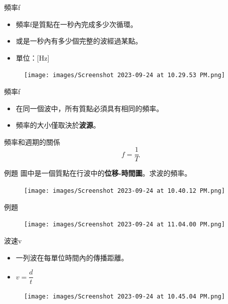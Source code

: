 \documentclass[13pt]{beamer}
\begin{document}
\begin{frame}{頻率f}
    \begin{itemize}
        \item 頻率f是質點在一秒內完成多少次循環。
        \item 或是一秒內有多少個完整的波經過某點。
        \item 單位：[Hz]
    \end{itemize}

    \begin{figure}
        \centering
        \texttt{[image: images/Screenshot 2023-09-24 at 10.29.53 PM.png]}


    \end{figure}
\end{frame}

\begin{frame}{頻率f}
    \begin{itemize}
        \item 在同一個波中，所有質點必須具有相同的頻率。
        \item 頻率的大小僅取決於\textbf{波源}。
    \end{itemize}\bigskip
    \begin{alertblock}{頻率和週期的關係}
        \[f=\frac{1}{T}\]
    \end{alertblock}
\end{frame}

\begin{frame}[t]{例題}
    圖中是一個質點在行波中的\textbf{位移-時間圖}。求波的頻率。
    \begin{figure}
        \centering
        \texttt{[image: images/Screenshot 2023-09-24 at 10.40.12 PM.png]}


    \end{figure}
\end{frame}
\begin{frame}{例題}
    \begin{figure}
        \centering
        \texttt{[image: images/Screenshot 2023-09-24 at 11.04.00 PM.png]}


    \end{figure}
\end{frame}
\begin{frame}{波速v}
    \begin{itemize}
        \item 一列波在每單位時間內的傳播距離。
        \item $v=\dfrac{d}{t}$
    \end{itemize}
    \begin{figure}
        \centering
        \texttt{[image: images/Screenshot 2023-09-24 at 10.45.04 PM.png]}


    \end{figure}
\end{frame}
\end{document}
